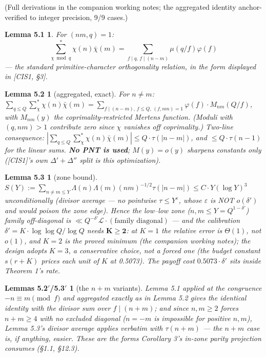 \documentclass[11pt]{amsart}
\theoremstyle{plain}
\newtheorem*{lemmafiveone}{Lemma 5.1}
\newtheorem*{lemmafivetwo}{Lemma 5.2}
\newtheorem*{lemmafivethree}{Lemma 5.3}
\newtheorem*{lemmasfivetwoprime}{Lemmas 5.2$'$/5.3$'$}
\theoremstyle{remark}
\begin{document}
(Full derivations in the companion working notes; the aggregated identity
anchor-verified to integer precision, 9/9 cases.)

\begin{lemmafiveone}
For $(nm, q) = 1$:
\[
\sum^{*}_{\chi \bmod q} \chi(n)\bar{\chi}(m)
= \sum_{f\mid q,\, f\mid(n-m)} \mu(q/f)\varphi(f)
\]
--- the standard primitive-character
orthogonality relation, in the form displayed in [CIS1, \S3].
\end{lemmafiveone}

\begin{lemmafivetwo}[aggregated, exact]
For $n \ne m$: $\sum_{q\le Q}\sum^{*}_{\chi} \chi(n)\bar{\chi}(m) =
\sum_{f\mid(n-m),\, f\le Q,\, (f,nm)=1} \varphi(f)\cdot M_{nm}(Q/f)$, with
$M_{nm}(y)$ the coprimality-restricted Mertens function. (Moduli with $(q, nm) > 1$
contribute zero since $\chi$ vanishes off coprimality.) Two-line consequence:
$|\sum_{q\le Q}\sum^{*}_{\chi} \chi(n)\bar{\chi}(m)| \le Q\cdot\tau(|n-m|)$, and
$\le Q\cdot\tau(n-1)$ for the linear sums. \textbf{No PNT is used}; $M(y) = o(y)$
sharpens constants only ([CIS1]'s own $\Delta' + \Delta''$ split is this
optimization).
\end{lemmafivetwo}

\begin{lemmafivethree}[zone bound]
$S(Y) := \sum_{n\ne m\le Y} \Lambda(n)\Lambda(m)(nm)^{-1/2}\tau(|n-m|) \le
C\cdot Y(\log Y)^3$ unconditionally (divisor average --- no pointwise
$\tau \le Y^\varepsilon$, whose $\varepsilon$ is NOT $o(\delta')$ and would poison the
zone edge). Hence the low--low zone ($n, m \le Y = Q^{1-\delta'}$) family
off-diagonal is $\ll Q^{-\delta'}\mathcal{L}\cdot(\text{family diagonal})$ --- and
the calibration $\delta' = K\cdot\log \log Q/\log Q$ needs $\boldsymbol{K \ge 2}$: at
$K = 1$ the relative error is $\Theta(1)$, not $o(1)$, and $K = 2$ is the proved
minimum (the companion working notes); the design adopts $K = 3$, a conservative
choice, not a forced one (the budget constant $s(r + K)$ prices each unit of $K$ at
0.5073). The payoff cost $0.5073\cdot\delta'$ sits inside Theorem 1's rate.
\end{lemmafivethree}

\begin{lemmasfivetwoprime}[the $n + m$ variants]
Lemma 5.1 applied at the congruence $-n \equiv m \pmod f$ and aggregated exactly as
in Lemma 5.2 gives the identical identity with the divisor sum over $f \mid (n + m)$;
and since $n, m \ge 2$ forces $n + m \ge 4$ with no excluded diagonal ($n = -m$ is
impossible for positive $n, m$), Lemma 5.3's divisor average applies verbatim with
$\tau(n + m)$ --- the $n + m$ case is, if anything, easier. These are the forms
Corollary 3's in-zone parity projection consumes (\S1.1, \S12.3).
\end{lemmasfivetwoprime}
\end{document}
